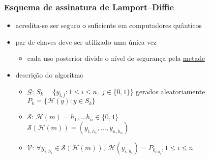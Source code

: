 \documentclass{beamer}
\begin{document}
\begin{frame}
  \frametitle{Esquema de assinatura de Lamport--Diffie \cite{Lamport1979}}
  \begin{itemize}
    \item acredita-se ser seguro o suficiente em computadores quânticos
    \item par de chaves deve ser utilizado uma única vez
    \begin{itemize}
      \item cada uso posterior divide o nível de segurança pela
        \href{https://crypto.stackexchange.com/a/2642}{metade}
    \end{itemize}
    \item descrição do algoritmo
    \begin{itemize}
      \item $\mathcal{G}$: $S_{k} = \{y_{i, j} : 1 \leq i \leq n, \;
        j \in \{0, 1\}\}$ gerados aleatoriamente \\
        \hspace{1.3em}$P_{k} = \{\mathcal{H}(y) : y \in S_{k}\}$
    \item $\mathcal{S}$: $\mathcal{H}(m)
        = h_{1}, \dots h_{n} \in \{0, 1\}$ \\
        \hspace{1.3em}$\mathcal{S}(\mathcal{H}(m))
          = (y_{1, h_{1}}, \dots, y_{n, h_{n}})$
      \item $\mathcal{V}$:
          $\forall y_{i, h_{i}} \in \mathcal{S}(\mathcal{H}(m)), \;
            \mathcal{H}(y_{i, h_{i}}) = P_{k_{i, h_{i}}}, 1 \leq i \leq n$
    \end{itemize}
  \end{itemize}
\end{frame}
\end{document}
